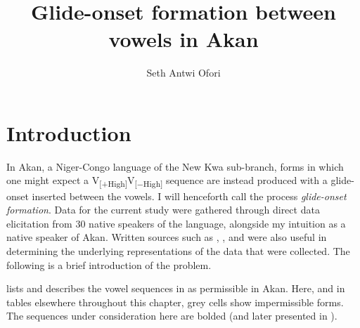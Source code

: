 \documentclass[output=paper,colorlinks,citecolor=brown]{langscibook}
\author{Seth Antwi Ofori\affiliation{University of Ghana, Legon}}
\title{Glide-onset formation between vowels in Akan} \label{Ch_Ofori}
\begin{document}
 
\maketitle

\section{Introduction}
In Akan, a Niger-Congo language of the New Kwa sub-branch, forms in which one might expect a V\textsubscript{[+High]}V\textsubscript{[−High]} sequence are instead produced with a glide-onset inserted between the vowels. I will henceforth call the process \textit{glide-onset formation}. Data for the current study were gathered through direct data elicitation from 30 native speakers of the language, alongside my intuition as a native speaker of Akan. Written sources such as \citet{deJongObeng2000}, \citet{Dolphyne1988}, and \citet{Ofori2006, Ofori2008, Ofori2013, Ofori2018, Ofori2019} were also useful in determining the underlying representations of the data that were collected. The following is a brief introduction of the problem.

\citet[8--14]{Dolphyne1988} lists and describes the  vowel sequences in  as permissible in Akan. Here, and in tables elsewhere throughout this chapter, grey cells show impermissible forms. The sequences under consideration here are bolded (and later presented in ).
\end{document}
